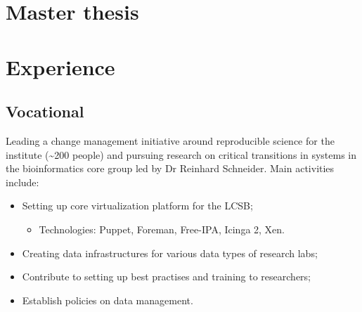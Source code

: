 \documentclass[11pt,a4paper,nolmodern]{moderncv}        %
\begin{document}

\section{Master thesis}


\section{Experience}
\subsection{Vocational}


{Leading a change management initiative around reproducible science for the institute (\textasciitilde 200 people) and pursuing research on critical transitions in systems in the bioinformatics core group led by Dr Reinhard Schneider. \newline{} Main activities include:
\begin{itemize}
	\item Setting up core virtualization platform for the LCSB;
	\begin{itemize}
		\item Technologies: Puppet, Foreman, Free-IPA, Icinga 2, Xen.
	\end{itemize}
	\item Creating data infrastructures for various data types of research labs;
	\item Contribute to setting up best practises and training to researchers;
	\item Establish policies on data management.
\end{itemize}}
\end{document}
